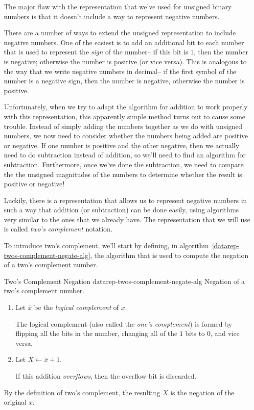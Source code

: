 The major flaw with the representation that we've used for
unsigned binary numbers is that it doesn't include a way to
represent negative numbers.

There are a number of ways to extend the unsigned representation
to include negative numbers.
One of the easiest is to add an additional bit
to each number that is used to represent the {\em sign} of the
number-- if this bit is $1$, then the number is negative; otherwise
the number is positive (or vice versa).
This is analogous to the way that we write negative numbers
in decimal-- if the first symbol of the number is a negative sign,
then the number is negative, otherwise the number is positive.

Unfortunately, when we try to adapt the algorithm for addition
to work properly with this representation, this apparently simple
method turns out to cause some trouble.
Instead of simply adding the numbers together
as we do with unsigned numbers, we now need to consider
whether the numbers being added are positive or negative.
If one number is positive and the other negative, then we
actually need to do subtraction instead of addition, so
we'll need to find an algorithm for subtraction.  Furthermore,
once we've done the subtraction, we need to compare the
the unsigned magnitudes of the numbers to determine whether the
result is positive or negative!

Luckily, there is a representation that allows us to represent
negative numbers in such a way that addition (or subtraction)
can be done easily, using algorithms very similar to the ones
that we already have.
The representation that we will use
is called {\em two's complement} notation.

To introduce two's complement, we'll start by defining, in
algorithm~\ref{datarep-twos-complement-negate-alg}, the
algorithm that is used to compute the negation of a two's complement number.

\begin{algorithm}{Two's Complement Negation}
	{datarep-twos-complement-negate-alg}{
        Negation of a two's complement number.
}

\begin{enumerate}
\item   Let $\bar{x}$ be the
        {\em logical complement} of $x$.

        The logical complement (also called the {\em one's complement})
         
        is formed by flipping all the bits in the number, changing
        all of the $1$ bits to $0$, and vice versa.

\item   Let $X \leftarrow \bar{x} + 1$.

        If this addition {\em overflows}, then the overflow bit
        is discarded.
\end{enumerate}

By the definition of two's complement, the resulting $X$ is the
negation of the original $x$.

\end{algorithm}

